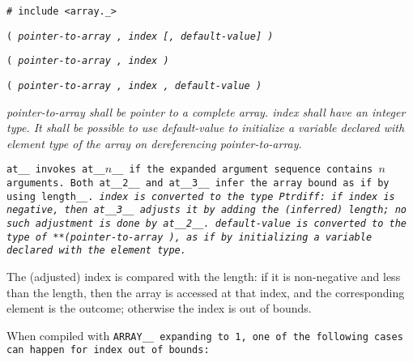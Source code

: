 
\tt{# include <array._>}

\s\s\s\s\tt{(} \it{pointer-to-array} \tt{,}
\it{index} [\tt{,} \it{default-value}] \tt{)}

\s\tt{(} \it{pointer-to-array} \tt{,}
\it{index} \tt{)}

\s\tt{(} \it{pointer-to-array} \tt{,}
\it{index} \phantom{[}\tt{,} \it{default-value}\phantom{]} \tt{)}


\it{pointer-to-array} shall be pointer to a complete array.
\it{index} shall have an integer type.
It shall be possible to use \it{default-value} to initialize a variable
declared with element type of the array on dereferencing \it{pointer-to-array}.


\tt{at__} invokes \tt{at__}$n$\_\_ if the
expanded argument sequence contains $n$ arguments.
Both \tt{at__2__} and \tt{at__3__} infer
the array bound as if by using \tt{length__}.
\it{index} is converted to the type \tt{Ptrdiff}:
if \it{index} is negative, then \tt{at__3__} adjusts it by adding
the (inferred) length; no such adjustment is done by \tt{at__2__}.
\it{default-value} is converted to the type of \tt{**(}\it{pointer-to-array}%
\tt{)}, as if by initializing a variable declared with the element type.

The (adjusted) index is compared with the length: if it is non-negative and
less than the length, then the array is accessed at that index, and the
corresponding element is the outcome; otherwise the index is out of bounds.

When compiled with \tt{ARRAY__} expanding to \tt{1},
one of the following cases can happen for index out of bounds:

